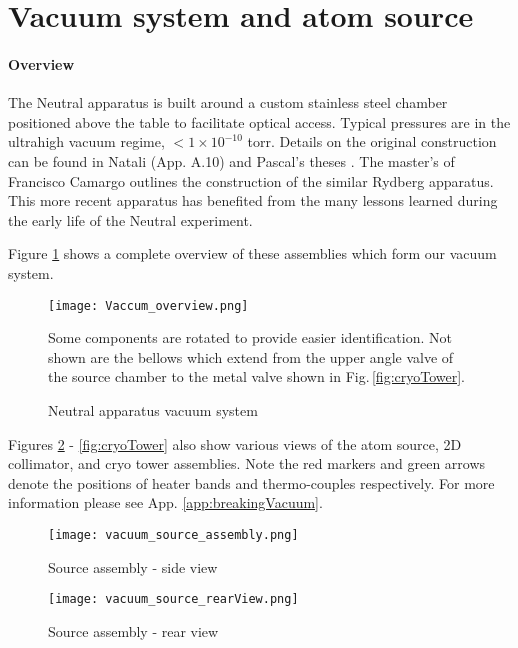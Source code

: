 \pagebreak
\section{Vacuum system and atom source} \label{sec:vac}
\setcounter{footnote}{0}
\paragraph{Overview}
	
The Neutral apparatus is built around a custom stainless steel chamber positioned above the table to facilitate optical access. Typical pressures are in the ultrahigh vacuum regime, $<1\times10^{-10}$ torr. 
Details on the original construction can be found in Natali (App. A.10) and Pascal's theses \cite{MartinezdeEscolar2010,Mickelson2010b}. The master's of Francisco Camargo \cite{Camargo2015} outlines the construction of the similar Rydberg apparatus. This more recent apparatus has benefited from the many lessons learned during the early life of the Neutral experiment.
\newline

\noindent Figure \ref{fig:vacuumSystem} shows a complete overview of these assemblies which form our vacuum system.
	\begin{figure} 
		\centerline{
		\texttt{[image: Vaccum\_overview.png]}}
		\caption{Neutral apparatus vacuum system}{Some components are rotated to provide easier identification. Not shown are the bellows which extend from the upper angle valve of the source chamber to the metal valve shown in Fig.\,\ref{fig:cryoTower}.}
		\label{fig:vacuumSystem}
	\end{figure}		
Figures \ref{fig:sourceSideView} - \ref{fig:cryoTower} also show various views of the atom source, 2D collimator, and cryo tower assemblies. Note the red markers and green arrows denote the positions of heater bands and thermo-couples respectively. For more information please see App. \ref{app:breakingVacuum}.
	\begin{figure} 
		\centerline{
		\texttt{[image: vacuum\_source\_assembly.png]}}
		\caption{Source assembly - side view}
		\label{fig:sourceSideView}
	\end{figure}
	
	\begin{figure} 
		\centerline{
		\texttt{[image: vacuum\_source\_rearView.png]}}
		\caption{Source assembly - rear view}
		\label{fig:sourceRearView}
	\end{figure}
	
